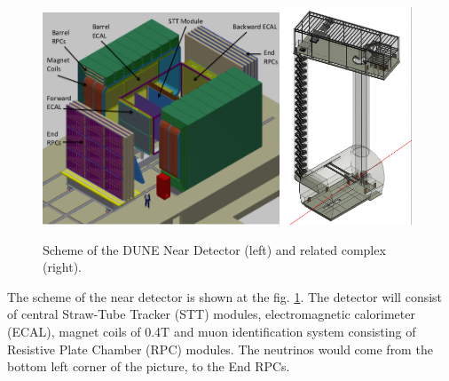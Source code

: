 
\begin{figure}
\caption{Scheme of the DUNE Near Detector (left) and related complex (right).}
\label{fig:nearDetector}
\centering
\includegraphics[width=0.63\textwidth, keepaspectratio=true]{figs/nearDetector.png}\includegraphics[width=0.35\textwidth, keepaspectratio=true]{figs/nearDetector_project.png}
\end{figure}

The scheme of the near detector is shown at the fig. \ref{fig:nearDetector}. The detector will consist of central Straw-Tube Tracker (STT) modules, electromagnetic calorimeter (ECAL), magnet coils of 0.4T and muon identification system consisting of Resistive Plate Chamber (RPC) modules. The neutrinos would come from the bottom left corner of the picture, to the End RPCs.

